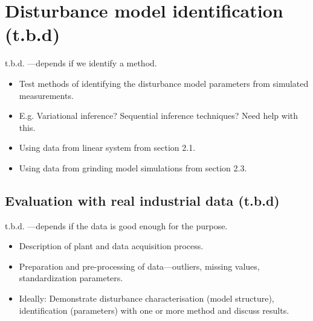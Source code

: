 \section{Disturbance model identification (t.b.d)}

t.b.d. —depends if we identify a method.

\begin{itemize}
	\item Test methods of identifying the disturbance model parameters from simulated measurements.
	\item E.g. Variational inference? Sequential inference techniques?  Need help with this.
	\item Using data from linear system from section 2.1.
	\item Using data from grinding model simulations from section 2.3.
\end{itemize}

\subsection{Evaluation with real industrial data (t.b.d)}

t.b.d. —depends if the data is good enough for the purpose.

\begin{itemize}
	\item Description of plant and data acquisition process.
	\item Preparation and pre-processing of data—outliers, missing values, standardization parameters.
	\item Ideally: Demonstrate disturbance characterisation (model structure), identification (parameters) with one or more method and discuss results. 
\end{itemize}